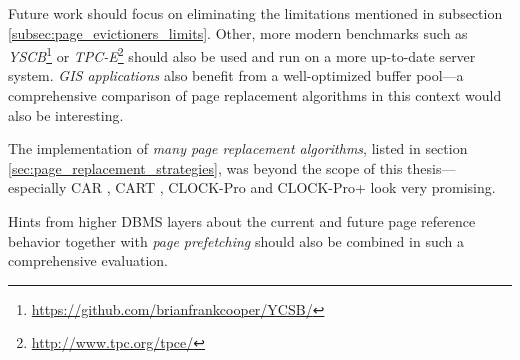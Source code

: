     Future work should focus on eliminating the limitations mentioned in subsection \ref{subsec:page_evictioners_limits}. Other, more modern benchmarks such as \emph{YSCB}\footnote{\url{https://github.com/brianfrankcooper/YCSB/}} or \emph{TPC-E}\footnote{\url{http://www.tpc.org/tpce/}} should also be used and run on a more up-to-date server system. \emph{GIS applications} also benefit from a well-optimized buffer pool---a comprehensive comparison of page replacement algorithms in this context would also be interesting.

    The implementation of \emph{many page replacement algorithms}, listed in section \ref{sec:page_replacement_strategies}, was beyond the scope of this thesis---especially CAR \cite{Bansal:2004}, CART \cite{Bansal:2004}, CLOCK-Pro \cite{Jiang:2005} and CLOCK-Pro+ \cite{Li:2019} look very promising.

    Hints from higher DBMS layers about the current and future page reference behavior together with \emph{page prefetching} should also be combined in such a comprehensive evaluation.
